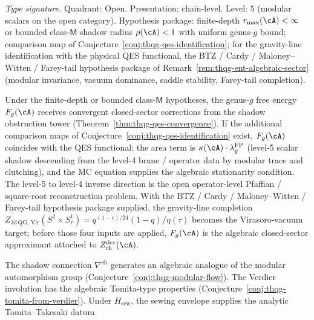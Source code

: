 \begin{conjecture}
\ClaimStatusConjectured
\label{conj:thqg-g12-target}
\textit{Type signature.}
Quadrant: Open. Presentation: chain-level. Level: $5$ (modular
scalars on the open category).
Hypothesis package: finite-depth $r_{\max}(\cA) < \infty$ or bounded
class-$\mathsf{M}$ shadow radius $\rho(\cA) < 1$ with uniform genus-$g$
bound; comparison map of
Conjecture~\ref{conj:thqg-qes-identification}; for the gravity-line
identification with the physical QES functional, the BTZ / Cardy /
Maloney--Witten / Farey-tail hypothesis package of
Remark~\ref{rem:thqg-ent-algebraic-sector}
\textup{(}modular invariance, vacuum dominance, saddle stability,
Farey-tail completion\textup{)}.

\medskip
Under the finite-depth or bounded class-$\mathsf M$ hypotheses,
the genus-$g$ free energy $F_g(\cA)$ receives convergent
closed-sector corrections from the shadow obstruction tower
(Theorem~\ref{thm:thqg-qes-convergence}).
If the additional comparison maps of
Conjecture~\ref{conj:thqg-qes-identification} exist, $F_g(\cA)$
coincides with the QES functional:
the area term is $\kappa(\cA) \cdot \lambda_g^{\mathrm{FP}}$
(level-5 scalar shadow descending from the level-4 brane / operator
data by modular trace and clutching), and the MC equation supplies
the algebraic stationarity condition. The level-5 to level-4 inverse
direction is the open operator-level Pfaffian / square-root
reconstruction problem. With the BTZ / Cardy / Maloney--Witten /
Farey-tail hypothesis package supplied, the gravity-line completion
$Z_{\mathrm{3d\,QG,\,Vir}}(S^2 \times S^1_\tau) =
q^{(1-c)/24}(1-q)/\eta(\tau)$ becomes the Virasoro-vacuum target;
before those four inputs are applied, $F_g(\cA)$ is the algebraic
closed-sector approximant attached to
$Z^{\mathrm{der}}_{\mathrm{ch}}(\cA)$.
\end{conjecture}

\begin{conjecture}
\ClaimStatusConjectured
\label{conj:thqg-g13-target}
The shadow connection $\nabla^{\mathrm{sh}}$ generates
an algebraic analogue of the modular automorphism group
(Conjecture~\ref{conj:thqg-modular-flow}).
The Verdier involution has the algebraic Tomita-type properties
(Conjecture~\ref{conj:thqg-tomita-from-verdier}).
Under $H_{\mathrm{sew}}$, the sewing envelope supplies the analytic
Tomita--Takesaki datum.
\end{conjecture}

